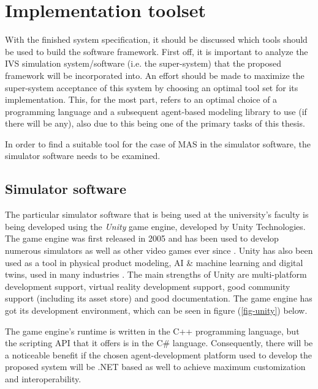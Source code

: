 \documentclass[main.tex]{subfiles}
\begin{document}
\section{Implementation toolset}\label{sec-toolset}

With the finished system specification, it should be discussed which tools should be used to build the software framework. 
First off, it is important to analyze the IVS simulation system/software (i.e. the super-system) that
the proposed framework will be incorporated into. An effort should be made to maximize the super-system acceptance of 
this system by choosing an optimal tool set for its implementation. This, for the most part,
refers to an optimal choice of a programming language and a subsequent agent-based modeling
library to use (if there will be any), also due to this being one of the primary tasks of this thesis. 

In order to find a suitable tool for the case of MAS in the simulator software, the simulator software needs to be examined.

\subsection{Simulator software}

The particular simulator software that is being used at the university's faculty is being
developed using the \emph{Unity} game engine, developed by Unity Technologies. The game engine
was first released in 2005 and has been used to develop numerous simulators as well as other
video games ever since \cite{UnityTechnologies2022}.  Unity has also been used as a tool in
physical product modeling, AI \& machine learning and digital twins, used in many industries
\cite{UnityTechnologies2022a}.  The main strengths of Unity are multi-platform development
support, virtual reality development support, good community support (including its asset
store) and good documentation. The game engine has got its development environment, which 
can be seen in figure (\ref{fig-unity}) below.

The game engine's runtime is written in the C++ programming language, but the scripting API 
that it offers is in the C\# language. Consequently, there will be a noticeable benefit 
if the chosen agent-development platform used to develop the proposed system will be .NET based as well 
to achieve maximum customization and interoperability.
\end{document}
